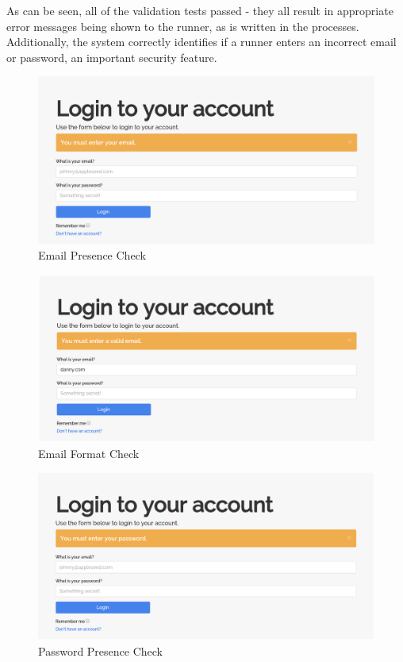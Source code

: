 \documentclass{article}[12pt,a4paper]
\begin{document}
As can be seen, all of the validation tests passed - they all result in appropriate error messages being shown to the runner, as is written in the processes. Additionally, the system correctly identifies if a runner enters an incorrect email or password, an important security feature.

\begin{figure}[h!]
  \includegraphics[scale=0.25]{images/testing/login_validation/email_presence}
  \caption{Email Presence Check}
\end{figure}

\begin{figure}[h!]
  \includegraphics[scale=0.25]{images/testing/login_validation/email_format}
  \caption{Email Format Check}
\end{figure}

\begin{figure}[h!]
  \includegraphics[scale=0.25]{images/testing/login_validation/password_presence}
  \caption{Password Presence Check}
\end{figure}
\end{document}
